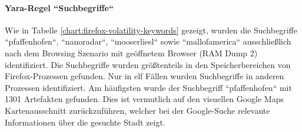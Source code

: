 \paragraph*{Yara-Regel ``Suchbegriffe``}
Wie in Tabelle \ref{chart:firefox-volatility-keywords} gezeigt, wurden die Suchbegriffe ``pfaffenhofen``, ``nanoradar``, ``mooserliesl`` sowie ``mallofamerica`` ausschließlich nach dem Browsing Szenario mit geöffnetem Browser (RAM Dump 2) identifiziert. Die Suchbegriffe wurden größtenteils in den Speicherbereichen von Firefox-Prozessen gefunden. Nur in elf Fällen wurden Suchbegriffe in anderen Prozessen identifiziert. Am häufigsten wurde der Suchbegriff ``pfaffenhofen`` mit 1301 Artefakten gefunden. Dies ist vermutlich auf den  visuellen Google Maps Kartenausschnitt zurückzuführen, welcher bei der Google-Suche relevante Informationen über die gesuchte Stadt zeigt. 


